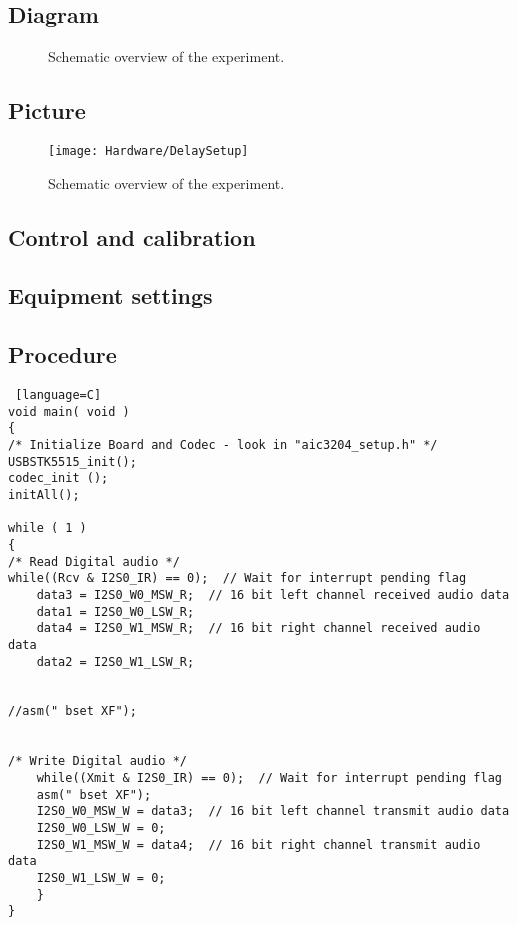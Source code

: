 \subsection{Diagram}

\begin{figure}[H]
	\centering
	
	\caption{Schematic overview of the experiment.}
	\label{fig:SchematicDelayExperiment}
\end{figure}

\subsection{Picture}

\begin{figure}[H]
	\centering
\texttt{[image: Hardware/DelaySetup]}
	\caption{Schematic overview of the experiment.}
	\label{fig:DelayExperimentSetu}
\end{figure}


\subsection{Control and calibration}

\subsection{Equipment settings}



\subsection{Procedure}

\begin{lstlisting} [language=C]
void main( void )
{
/* Initialize Board and Codec - look in "aic3204_setup.h" */
USBSTK5515_init();
codec_init ();
initAll();

while ( 1 )
{
/* Read Digital audio */
while((Rcv & I2S0_IR) == 0);  // Wait for interrupt pending flag
	data3 = I2S0_W0_MSW_R;  // 16 bit left channel received audio data
	data1 = I2S0_W0_LSW_R;
	data4 = I2S0_W1_MSW_R;  // 16 bit right channel received audio data
	data2 = I2S0_W1_LSW_R;


//asm(" bset XF");


/* Write Digital audio */
	while((Xmit & I2S0_IR) == 0);  // Wait for interrupt pending flag
	asm(" bset XF");
	I2S0_W0_MSW_W = data3;  // 16 bit left channel transmit audio data
	I2S0_W0_LSW_W = 0;
	I2S0_W1_MSW_W = data4;  // 16 bit right channel transmit audio data
	I2S0_W1_LSW_W = 0;
	}
}
\end{lstlisting}



